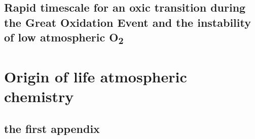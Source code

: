 \documentclass[11pt, proquest]{uwthesis}[2016/11/22]
\begin{document}
\chapter{Rapid timescale for an oxic transition during the Great Oxidation Event and the instability of low atmospheric O\textsubscript{2}}
\newpage


\part{Origin of life atmospheric chemistry}



\printendnotes

%
%
\nocite{*}


%
%
\appendix
\raggedbottom\sloppy
 
 
\chapter{the first appendix}
 
\end{document}
